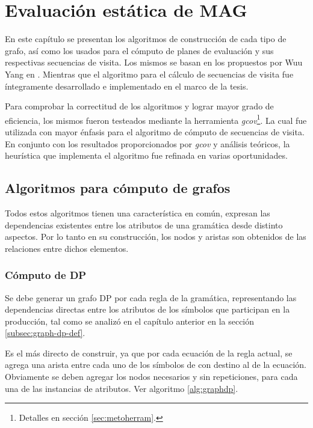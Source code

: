 \chapter{Evaluación estática de MAG}
\label{chap:eval_est}
\minitoc

En este capítulo se presentan los algoritmos de construcción de cada tipo de grafo, así como los usados para el cómputo de planes de evaluación y sus respectivas secuencias de visita. Los mismos se basan en los propuestos por Wuu Yang en \cite{wuu-yang1}. Mientras que el algoritmo para el cálculo de secuencias de visita fue íntegramente desarrollado e implementado en el marco de la tesis.

Para comprobar la correctitud de los algoritmos y lograr mayor grado de eficiencia, los mismos fueron testeados mediante la herramienta \textit{gcov}\footnote{Detalles en sección \ref{sec:metoherram}.}. La cual fue utilizada con mayor énfasis para el algoritmo de cómputo de secuencias de visita. En conjunto con los resultados proporcionados por \textit{gcov} y análisis teóricos, la heurística que implementa el algoritmo fue refinada en varias oportunidades.

\section{Algoritmos para cómputo de grafos}

Todos estos algoritmos tienen una característica en común, expresan las dependencias existentes entre los atributos de una gramática desde distinto aspectos. Por lo tanto en su construcción, los nodos y aristas son obtenidos de las relaciones entre dichos elementos.

\subsection{Cómputo de DP}
\label{subsec:alg-DP}
Se debe generar un grafo DP por cada regla de la gramática, representando las dependencias directas entre los atributos de los símbolos que participan en la producción, tal como se analizó en el capítulo anterior en la sección \ref{subsec:graph-dp-def}.

Es el más directo de construir, ya que por cada ecuación de la regla actual, se agrega una arista entre cada uno de los símbolos de  con destino al  de la ecuación. Obviamente se deben agregar los nodos necesarios y sin repeticiones, para cada una de las instancias de atributos. Ver algoritmo \ref{alg:graphdp}.

